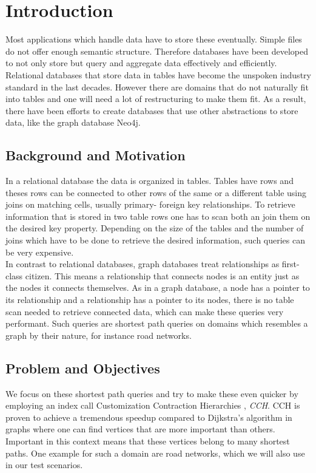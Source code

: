 \chapter{Introduction}

Most applications which handle data have to store these eventually.
Simple files do not offer enough semantic structure.
Therefore databases have been developed to not only store but query and aggregate data effectively and efficiently.
Relational databases that store data in tables have become the unspoken industry standard in the last decades. 
However there are domains that do not naturally fit into tables and one will need a lot of restructuring to make them fit.
As a result, there have been efforts to create databases that use other abstractions to store data, like the graph database Neo4j.

\section{Background and Motivation}

In a relational database the data is organized in tables.
Tables have rows and theses rows can be connected to other rows of the same or a different table using joins on matching cells, usually primary- foreign key relationships.
To retrieve information that is stored in two table rows one has to scan both an join them on the desired key property.
Depending on the size of the tables and the number of joins which have to be done to retrieve the desired information, such queries can be very expensive.
\\
In contrast to relational databases, graph databases treat relationships as first-class citizen.
This means a relationship that connects nodes is an entity just as the nodes it connects themselves.
As in a graph database, a node has a pointer to its relationship and a relationship has a pointer to its nodes, there is no table scan needed to retrieve connected data, which can make these queries very performant.
Such queries are shortest path queries on domains which resembles a graph by their nature, for instance road networks. 

\section{Problem and Objectives}

We focus on these shortest path queries and try to make these even quicker by employing an index call Customization Contraction Hierarchies \cite{CCH}, \textit{CCH}. 
CCH is proven to achieve a tremendous speedup compared to Dijkstra's algorithm in graphs where one can find vertices that are more important than others.
Important in this context means that these vertices belong to many shortest paths.
One example for such a domain are road networks, which we will also use in our test scenarios.

